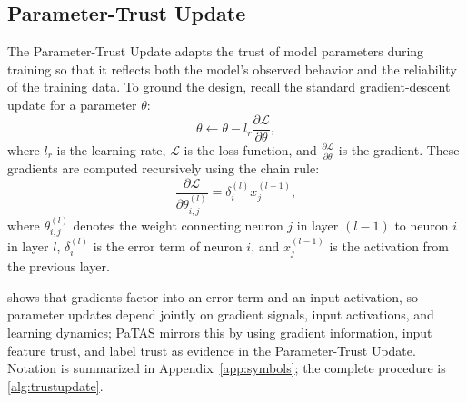 \subsection{Parameter-Trust Update}\label{sec:ptasfunc}
The Parameter-Trust Update adapts the trust of model parameters during training so that it reflects both the model's observed behavior and the reliability of the training data. To ground the design, recall the standard gradient-descent update for a parameter $\theta$:
\begin{equation}
\label{eq:gd1}
\theta \leftarrow \theta - l_r  \frac{\partial \mathcal{L}}{\partial \theta},
\end{equation}
where $l_r$ is the learning rate, $\mathcal{L}$ is the loss function, and $\frac{\partial \mathcal{L}}{\partial \theta}$ is the gradient. These gradients are computed recursively using the chain rule:
\begin{equation}
\label{eq:gd2}
\frac{\partial \mathcal{L}}{\partial \theta^{(l)}_{i,j}}
= \delta^{(l)}_i x^{(l-1)}_j,
\end{equation}
where $\theta^{(l)}_{i,j}$ denotes the weight connecting neuron $j$ in layer $(l-1)$ to neuron $i$ in layer $l$, $\delta^{(l)}_i$ is the error term of neuron $i$, and $x^{(l-1)}_j$ is the activation from the previous layer.

 shows that gradients factor into an error term and an input activation, so parameter updates depend jointly on gradient signals, input activations, and learning dynamics; PaTAS mirrors this by using gradient information, input feature trust, and label trust as evidence in the Parameter-Trust Update. Notation is summarized in Appendix~\ref{app:symbols}; the complete procedure is \cref{alg:trustupdate}.

